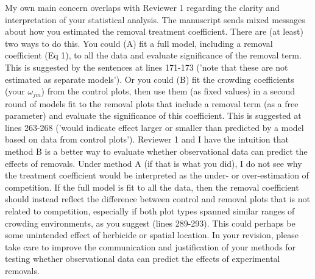 \documentclass[12pt]{article}
\begin{document}
My own main concern overlaps with Reviewer 1 regarding the clarity and interpretation of your statistical analysis. The manuscript sends mixed messages about how you estimated the removal treatment coefficient. There are (at least) two ways to do this. You could (A) fit a full model, including a removal coefficient (Eq 1), to all the data and evaluate significance of the removal term. This is suggested by the sentences at lines 171-173 ('note that these are not estimated as separate models'). Or you could (B) fit the crowding coefficients (your $\omega_{jm}$) from the control plots, then use them (as fixed values) in a second round of models fit to the removal plots that include a removal term (as a free parameter) and evaluate the significance of this coefficient. This is suggested at lines 263-268 ('would indicate effect larger or smaller than predicted by a model based on data from control plots'). Reviewer 1 and I have the intuition that method B is a better way to evaluate whether observational data can predict the effects of removals. Under method A (if that is what you did), I do not see why the treatment coefficient would be interpreted as the under- or over-estimation of competition. If the full model is fit to all the data, then the removal coefficient should instead reflect the difference between control and removal plots that is not related to competition, especially if both plot types spanned similar ranges of crowding environments, as you suggest (lines 289-293). This could perhaps be some unintended effect of herbicide or spatial location. In your revision, please take care to improve the communication and justification of your methods for testing whether observational data can predict the effects of experimental removals. 
\end{document}
